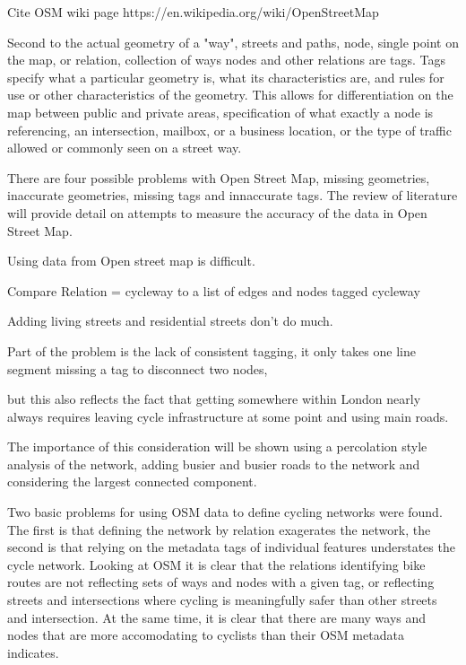 \documentclass[11pt]{article} %
\begin{document}
Cite OSM wiki page
https://en.wikipedia.org/wiki/OpenStreetMap

Second to the actual geometry of a "way", streets and paths, node, single point on the map, or relation, collection of ways nodes and other relations are tags. Tags specify what a particular geometry is, what its characteristics are, and rules for use or other characteristics of the geometry. This allows for differentiation on the map between public and private areas, specification of what exactly a node is referencing, an intersection, mailbox, or a business location, or the type of traffic allowed or commonly seen on a street way. 

There are four possible problems with Open Street Map, missing geometries, inaccurate geometries, missing tags and innaccurate tags. The review of literature will provide detail on attempts to measure the accuracy of the data in Open Street Map. 

Using data from Open street map is difficult. 

Compare Relation = cycleway to a list of edges and nodes tagged cycleway

Adding living streets and residential streets don't do much. 

Part of the problem is the lack of consistent tagging, it only takes one line segment missing a tag to disconnect two nodes,

but this also reflects the fact that getting somewhere within London nearly always requires leaving cycle infrastructure at some point and using main roads. 

The importance of this consideration will be shown using a percolation style analysis of the network, adding busier and busier roads to the network and considering the largest connected component. 


Two basic problems for using OSM data to define cycling networks were found. The first is that defining the network by relation exagerates the network, the second is that relying on the metadata tags of individual features understates the cycle network. Looking at OSM it is clear that the relations identifying bike routes are not reflecting sets of ways and nodes with a given tag, or reflecting streets and intersections where cycling is meaningfully safer than other streets and intersection. At the same time, it is clear that there are many ways and nodes that are more accomodating to cyclists than their OSM metadata indicates. 
\end{document}
